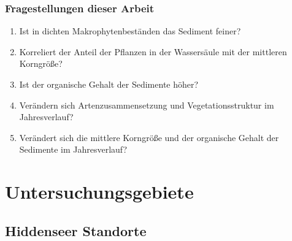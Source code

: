 \documentclass{beamer}
\begin{document}
\begin{frame}
\frametitle{Fragestellungen dieser Arbeit}
\begin{enumerate}
\pause
\item Ist in dichten Makrophytenbeständen das Sediment feiner?
\pause
\item Korreliert der Anteil der Pflanzen in der Wassersäule mit der mittleren Korngröße?
\pause
\item Ist der organische Gehalt der Sedimente höher?
\pause
\item Verändern sich Artenzusammensetzung und Vegetationsstruktur im Jahresverlauf?
\pause
\item Verändert sich die mittlere Korngröße und der organische Gehalt der Sedimente im Jahresverlauf? 
\end{enumerate}
\end{frame}

\section{Untersuchungsgebiete}

\subsection{Hiddenseer Standorte}
\end{document}
